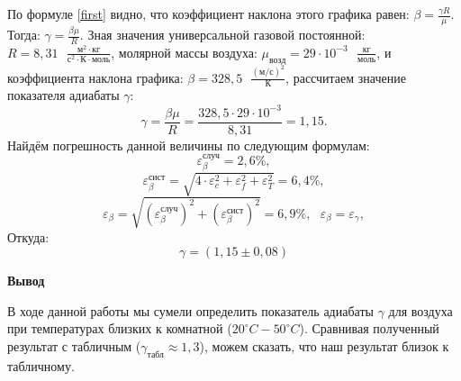 \documentclass[a4paper, 12pt]{article}
\begin{document}
\begin{enumerate}
        По формуле \eqref{first} видно, что коэффициент наклона этого графика равен: $\beta = \frac{\gamma R}{\mu}$. Тогда: $\gamma = \frac{\beta \mu}{R}$. Зная значения универсальной газовой постоянной: $R = 8,31 \text{ } \frac{\text{м}^2 \cdot \text{кг}}{\text{с}^2 \cdot К \cdot \text{моль}}$, молярной массы воздуха: $\mu_{возд} = 29 \cdot 10^{-3} \text{ } \frac{\text{кг}}{\text{моль}}$, и коэффициента наклона графика: $\beta = 328,5 \text{ } \frac{(\text{м/с})^2}{\text{К}}$, рассчитаем значение показателя адиабаты $\gamma$:
        \begin{equation}
            \gamma = \frac{\beta \mu}{R} = \frac{328,5 \cdot 29 \cdot 10^{-3}}{8,31} = 1,15.
        \end{equation}
        Найдём погрешность данной величины по следующим формулам:
        \begin{equation}
            \varepsilon_{\beta}^{\text{случ}} = 2,6\%,
        \end{equation}
        \begin{equation}
            \varepsilon_{\beta}^{\text{сист}} = \sqrt{4 \cdot \varepsilon_{c}^2 + \varepsilon_{f}^2 + \varepsilon_{T}^2} = 6,4\%,
        \end{equation}
        \begin{equation}
            \varepsilon_{\beta} = \sqrt{(\varepsilon_{\beta}^{\text{случ}})^2 + (\varepsilon_{\beta}^{\text{сист}})^2} = 6,9\%, \text{ } \varepsilon_{\beta} = \varepsilon_{\gamma},
        \end{equation}
        Откуда:
        \begin{equation}
            \gamma = (1,15 \pm 0,08)
        \end{equation}
        
    \end{enumerate}
    
    \begin{flushleft}
        {\Large {\bf Вывод}}
    \end{flushleft}
    
    В ходе данной работы мы сумели определить показатель адиабаты $\gamma$ для воздуха при температурах близких к комнатной ($20^\circ C - 50^\circ C$). Сравнивая полученный результат с табличным ($\gamma_{\text{табл}} \approx 1,3$), можем сказать, что наш результат близок к табличному.
    
\end{document}
